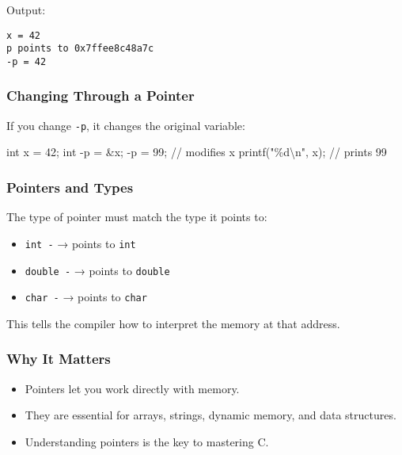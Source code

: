 \documentclass[
  letterpaper,
  DIV=11,
  numbers=noendperiod]{scrreprt}
\newenvironment{Shaded}{\begin{snugshade}}{\end{snugshade}}
\newcommand{\CommentTok}[1]{\textcolor[rgb]{0.37,0.37,0.37}{#1}}
\newcommand{\DataTypeTok}[1]{\textcolor[rgb]{0.68,0.00,0.00}{#1}}
\newcommand{\DecValTok}[1]{\textcolor[rgb]{0.68,0.00,0.00}{#1}}
\newcommand{\NormalTok}[1]{\textcolor[rgb]{0.00,0.23,0.31}{#1}}
\newcommand{\OperatorTok}[1]{\textcolor[rgb]{0.37,0.37,0.37}{#1}}
\newcommand{\SpecialCharTok}[1]{\textcolor[rgb]{0.37,0.37,0.37}{#1}}
\newcommand{\StringTok}[1]{\textcolor[rgb]{0.13,0.47,0.30}{#1}}
\providecommand{\tightlist}{%
  \setlength{\itemsep}{0pt}\setlength{\parskip}{0pt}}
\begin{document}
Output:

\begin{verbatim}
x = 42
p points to 0x7ffee8c48a7c
-p = 42
\end{verbatim}

\subsubsection{Changing Through a
Pointer}\label{changing-through-a-pointer}

If you change \texttt{-p}, it changes the original variable:

\begin{Shaded}
\begin{Highlighting}[]
\DataTypeTok{int}\NormalTok{ x }\OperatorTok{=} \DecValTok{42}\OperatorTok{;}
\DataTypeTok{int} \OperatorTok{{-}}\NormalTok{p }\OperatorTok{=} \OperatorTok{\&}\NormalTok{x}\OperatorTok{;}
\OperatorTok{{-}}\NormalTok{p }\OperatorTok{=} \DecValTok{99}\OperatorTok{;}        \CommentTok{// modifies x}
\NormalTok{printf}\OperatorTok{(}\StringTok{"}\SpecialCharTok{\%d\textbackslash{}n}\StringTok{"}\OperatorTok{,}\NormalTok{ x}\OperatorTok{);}   \CommentTok{// prints 99}
\end{Highlighting}
\end{Shaded}

\subsubsection{Pointers and Types}\label{pointers-and-types}

The type of pointer must match the type it points to:

\begin{itemize}
\tightlist
\item
  \texttt{int\ -} → points to \texttt{int}
\item
  \texttt{double\ -} → points to \texttt{double}
\item
  \texttt{char\ -} → points to \texttt{char}
\end{itemize}

This tells the compiler how to interpret the memory at that address.

\subsubsection{Why It Matters}\label{why-it-matters-29}

\begin{itemize}
\tightlist
\item
  Pointers let you work directly with memory.
\item
  They are essential for arrays, strings, dynamic memory, and data
  structures.
\item
  Understanding pointers is the key to mastering C.
\end{itemize}
\end{document}
